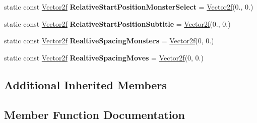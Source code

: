 \begin{DoxyCompactItemize}
\item 
\mbox{\label{classmonsterbattle_1_1DisplayableTextManager_a548521602a550171c4c0799764fa8a0b}} 
static const \hyperlink{structmonsterbattle_1_1Vector}{Vector2f} {\bfseries Relative\+Start\+Position\+Monster\+Select} = \hyperlink{structmonsterbattle_1_1Vector}{Vector2f}(0., 0.)
\item 
\mbox{\label{classmonsterbattle_1_1DisplayableTextManager_a6d57c26b21aaeb8f3c19f507604654bc}} 
static const \hyperlink{structmonsterbattle_1_1Vector}{Vector2f} {\bfseries Relative\+Start\+Position\+Subtitle} = \hyperlink{structmonsterbattle_1_1Vector}{Vector2f}(0., 0.)
\item 
\mbox{\label{classmonsterbattle_1_1DisplayableTextManager_a1da75570c36325bbecc4ecf0da8b1b03}} 
static const \hyperlink{structmonsterbattle_1_1Vector}{Vector2f} {\bfseries Realtive\+Spacing\+Monsters} = \hyperlink{structmonsterbattle_1_1Vector}{Vector2f}(0, 0.)
\item 
\mbox{\label{classmonsterbattle_1_1DisplayableTextManager_a302edc0f4e06317b1683fd604477b1c5}} 
static const \hyperlink{structmonsterbattle_1_1Vector}{Vector2f} {\bfseries Realtive\+Spacing\+Moves} = \hyperlink{structmonsterbattle_1_1Vector}{Vector2f}(0, 0.)
\end{DoxyCompactItemize}
\subsection*{Additional Inherited Members}


\subsection{Member Function Documentation}
\mbox{\label{classmonsterbattle_1_1DisplayableTextManager_a513b27b56122e391f585effa42c7bb0e}} 
